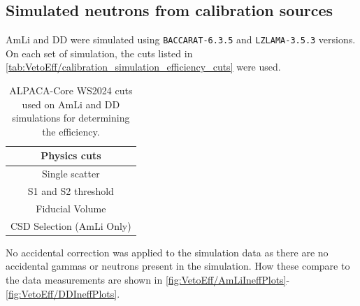 \subsection{Simulated neutrons from calibration sources}
AmLi and DD were simulated using \lstinline{BACCARAT-6.3.5} and \lstinline{LZLAMA-3.5.3} versions.
On each set of simulation, the cuts listed in \autoref{tab:VetoEff/calibration_simulation_efficiency_cuts} were used.
\begin{table}[!ht]
	\centering
	\caption{ALPACA-Core WS2024 cuts used on AmLi and DD simulations for determining the efficiency.}
	\begin{tabular}{|c|}
    \hline
		\textbf{Physics cuts}              \\
		\hline
		Single scatter            \\
		S1 and S2 threshold       \\
		Fiducial Volume           \\
		CSD Selection (AmLi Only) \\
        \hline
	\end{tabular}
	\label{tab:VetoEff/calibration_simulation_efficiency_cuts}
\end{table}
No accidental correction was applied to the simulation data as there are no accidental gammas or neutrons present in the simulation.
How these compare to the data measurements are shown in \autoref{fig:VetoEff/AmLiIneffPlots}-\ref{fig:VetoEff/DDIneffPlots}.
